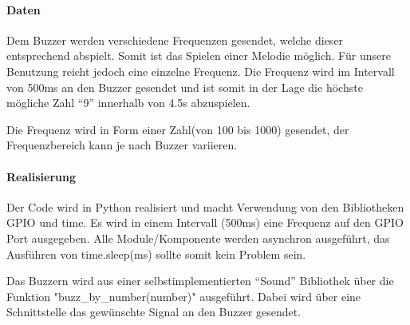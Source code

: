 \documentclass[../../main.tex]{subfiles}
\begin{document}
\paragraph{Daten}
Dem Buzzer werden verschiedene Frequenzen gesendet, welche dieser entsprechend abspielt. Somit ist das Spielen einer Melodie möglich. Für unsere Benutzung reicht jedoch eine einzelne Frequenz. Die Frequenz wird im Intervall von 500ms an den Buzzer gesendet und ist somit in der Lage die höchste mögliche Zahl ``9'' innerhalb von 4.5s abzuspielen.

Die Frequenz wird in Form einer Zahl(von 100 bis 1000) gesendet, der Frequenzbereich kann je nach Buzzer variieren.

\paragraph{Realisierung}
Der Code wird in Python realisiert und macht Verwendung von den Bibliotheken GPIO und time. Es wird in einem Intervall (500ms) eine Frequenz auf den GPIO Port ausgegeben. Alle Module/Komponente werden asynchron ausgeführt, das Ausführen von time.sleep(ms) sollte somit kein Problem sein.

Das Buzzern wird aus einer selbstimplementierten ``Sound'' Bibliothek über die Funktion "buzz\_by\_number(number)" ausgeführt. Dabei wird über eine Schnittstelle das gewünschte Signal an den Buzzer gesendet.
\end{document}
